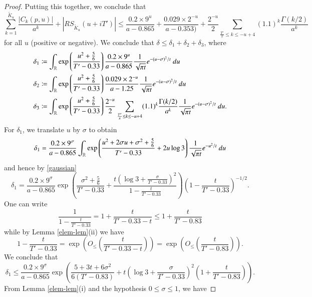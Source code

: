 \begin{proof}
Putting this together, we conclude that
$$
\sum_{k=1}^{\tilde K_u} \frac{|C_k(p,u)|}{a^k} + |RS_{\tilde K_u}(u + iT')| \leq 
\frac{0.2 \times 9^u}{a-0.865} + \frac{0.029 \times 2^{-u}}{a - 0.353)} + \frac{2^{-u}}{2} \sum_{\frac{T'}{\pi} \leq k \leq -u+4} (1.1)^{k} \frac{\Gamma(k/2)}{a^k}$$
for all $u$ (positive or negative).  We conclude that $\delta \leq \delta_1 + \delta_2 + \delta_3$, where
\begin{align}
\delta_1 &\coloneqq \int_{\mathbb{R}} \exp\left( \frac{u^2 + \frac{5}{6}}{T'-0.33} \right) \frac{0.2 \times 9^u}{a-0.865} \frac{1}{\sqrt{\pi t}} e^{-(u-\sigma)^2/t}\ du \nonumber\\
\delta_2 &\coloneqq \int_{\mathbb{R}} \exp\left( \frac{u^2 + \frac{5}{6}}{T'-0.33} \right) \frac{0.029 \times 2^{-u}}{a - 1.25} \frac{1}{\sqrt{\pi t}} e^{-(u-\sigma)^2/t}\ du \nonumber\\
\delta_3 &\coloneqq \int_{\mathbb{R}} \exp\left( \frac{u^2 + \frac{5}{6}}{T'-0.33} \right) \frac{2^{-u}}{2} \sum_{\frac{T'}{\pi} \leq k \leq -u+4} (1.1)^{k} \frac{\Gamma(k/2)}{a^k} \frac{1}{\sqrt{\pi t}} e^{-(u-\sigma)^2/t}\ du.\label{delta3-def}
\end{align}
For $\delta_1$, we translate $u$ by $\sigma$ to obtain
$$ \delta_1 = \frac{0.2 \times 9^\sigma}{a-0.865} \int_{\mathbb{R}} \exp\left( \frac{u^2 + 2 \sigma u + \sigma^2 + \frac{5}{6}}{T'-0.33}  + 2 u \log 3 \right) \frac{1}{\sqrt{\pi t}} e^{-u^2/t}\ du$$
and hence by \eqref{gaussian}
\begin{equation}\label{delta1}
 \delta_1 = \frac{0.2 \times 9^\sigma}{a-0.865} \exp\left( \frac{\sigma^2 + \frac{5}{6}}{T'-0.33} + \frac{t(\log 3 + \frac{\sigma}{T'-0.33})^2}{1 - \frac{t}{T'-0.33}} \right) \left(1 - \frac{t}{T'-0.33}\right)^{-1/2}.
\end{equation}
One can write
\begin{equation}\label{hit}
 \frac{1}{1 - \frac{t}{T'-0.33}} = 1 + \frac{t}{T'-0.33-t} \leq 1 + \frac{t}{T'-0.83}
\end{equation}
while by Lemma \ref{elem-lem}(ii) we have
\begin{equation}\label{hit2}
 1 - \frac{t}{T'-0.33} = \exp\left( O_{\leq}\left( \frac{t}{T'-0.33-t} \right) \right) = \exp\left( O_{\leq}\left( \frac{t}{T'-0.83} \right) \right).
\end{equation}
We conclude that
$$ \delta_1 \leq \frac{0.2 \times 9^\sigma}{a-0.865} \exp\left( \frac{5+3t+6\sigma^2}{6(T'-0.83)} + t\left(\log 3 + \frac{\sigma}{T'-0.33}\right)^2 \left(1 + \frac{t}{T'-0.83}\right) \right).$$
From Lemma \ref{elem-lem}(i) and the hypothesis $0 \leq \sigma \leq 1$, we have

\end{proof}
